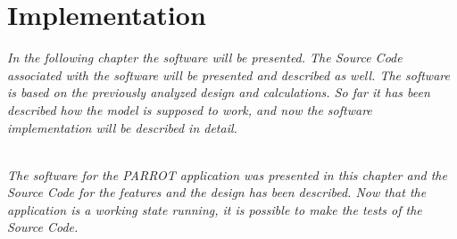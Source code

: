 \chapter{Implementation}
\label{imp}
\textit{In the following chapter the software will be presented. The Source Code associated with the software will be presented and described as well. The software is based on the previously analyzed design and calculations. So far it has been described how the model is supposed to work, and now the software implementation will be described in detail.}

\\
\textit{The software for the PARROT application was presented in this chapter and the Source Code for the features and the design has been described. Now that the application is a working state running, it is possible to make the tests of the Source Code.}